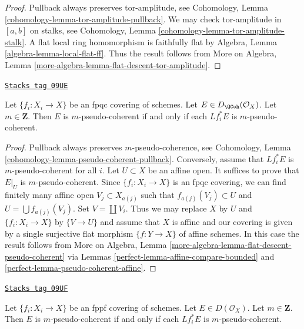 \begin{proof}
Pullback always preserves tor-amplitude, see
Cohomology, Lemma \ref{cohomology-lemma-tor-amplitude-pullback}.
We may check tor-amplitude in $[a, b]$ on stalks, see
Cohomology, Lemma \ref{cohomology-lemma-tor-amplitude-stalk}.
A flat local ring homomorphism is faithfully flat by
Algebra, Lemma \ref{algebra-lemma-local-flat-ff}.
Thus the result follows from
More on Algebra, Lemma
\ref{more-algebra-lemma-flat-descent-tor-amplitude}.
\end{proof}

\begin{lemma}
\label{perfect-lemma-pseudo-coherent-descends-fpqc}
\href{https://stacks.math.columbia.edu/tag/09UE}{\texttt{Stacks tag 09UE}}

Let $\{f_i : X_i \to X\}$ be an fpqc covering of schemes. Let
$E \in D_\QCoh(\mathcal{O}_X)$. Let $m \in \mathbf{Z}$.
Then $E$ is $m$-pseudo-coherent if and only if each
$Lf_i^*E$ is $m$-pseudo-coherent.
\end{lemma}

\begin{proof}

Pullback always preserves $m$-pseudo-coherence, see
Cohomology, Lemma \ref{cohomology-lemma-pseudo-coherent-pullback}.
Conversely, assume that $Lf_i^*E$ is $m$-pseudo-coherent for all $i$.
Let $U \subset X$ be an affine open. It suffices to prove that
$E|_U$ is $m$-pseudo-coherent. Since $\{f_i : X_i \to X\}$ is an
fpqc covering, we can find finitely many affine open $V_j \subset X_{a(j)}$
such that $f_{a(j)}(V_j) \subset U$ and $U = \bigcup f_{a(j)}(V_j)$.
Set $V = \coprod V_i$.
Thus we may replace $X$ by $U$ and $\{f_i : X_i \to X\}$ by
$\{V \to U\}$ and assume that $X$ is affine and our covering
is given by a single surjective flat morphism $\{f : Y \to X\}$
of affine schemes. In this case the result follows from
More on Algebra, Lemma \ref{more-algebra-lemma-flat-descent-pseudo-coherent}
via Lemmas \ref{perfect-lemma-affine-compare-bounded} and
\ref{perfect-lemma-pseudo-coherent-affine}.
\end{proof}

\begin{lemma}
\label{perfect-lemma-pseudo-coherent-descends-fppf}
\href{https://stacks.math.columbia.edu/tag/09UF}{\texttt{Stacks tag 09UF}}

Let $\{f_i : X_i \to X\}$ be an fppf covering of schemes. Let
$E \in D(\mathcal{O}_X)$. Let $m \in \mathbf{Z}$.
Then $E$ is $m$-pseudo-coherent if and only if each
$Lf_i^*E$ is $m$-pseudo-coherent.
\end{lemma}

